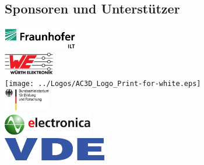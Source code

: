 \documentclass[a4paper,12pt,notumble]{leaflet}
\begin{document}
\noindent
\begin{minipage}[c][0.32\textheight][t]{\textwidth}
	\begin{center}
		\section{Sponsoren und Unterstützer}
		\vspace{0.7cm}
		\includegraphics[height=1cm]{../Logos/Fraunhofer_ILT_klein.png} \\ \vspace{0.2cm}
		\includegraphics[height=1cm]{../Logos/Wuerth.png} \\ %
		\texttt{[image: ../Logos/AC3D\_Logo\_Print-for-white.eps]} \\ \vspace{0.2cm}
		\includegraphics[height=1cm]{../Logos/BMBF.png} \\ \vspace{0.2cm}
		\includegraphics[height=1cm]{../Logos/electronica.png} \\ \vspace{0.2cm}
		\includegraphics[height=1cm]{../Logos/VDE.png}
	\end{center}
\end{minipage}
\end{document}
